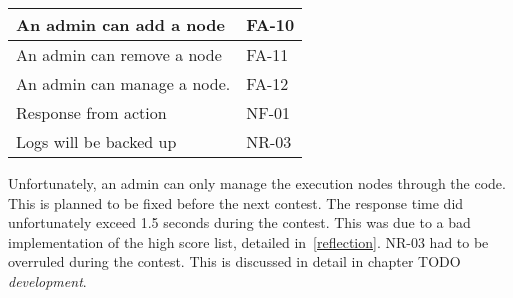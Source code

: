 \begin{longtable}{|l|l|}
    \hline
    An admin can add a node & FA-10 \\
    \hline
    An admin can remove a node & FA-11 \\
    \hline
    An admin can manage a node.  & FA-12 \\
    \hline
    Response from action & NF-01 \\
    \hline
    Logs will be backed up & NR-03 \\
    \hline
\end{longtable}

Unfortunately, an admin can only manage the execution nodes through the
code. This is planned to be fixed before the next contest. The response
time did unfortunately exceed 1.5 seconds during the contest. This was
due to a bad implementation of the high score list, detailed
in~\ref{reflection}. NR-03 had to be overruled during the contest. This is
discussed in detail in chapter TODO
\textit{development}.
